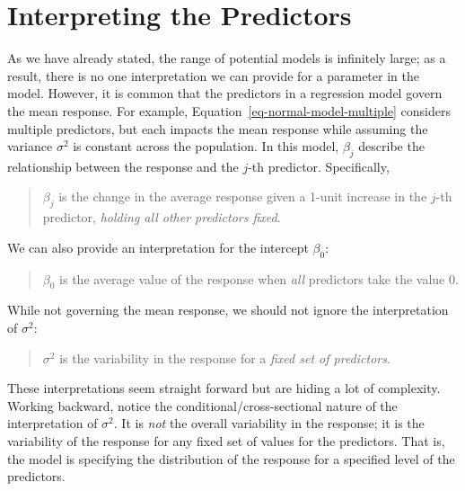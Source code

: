 \documentclass[
  letterpaper,
  DIV=11,
  numbers=noendperiod]{scrreprt}
\theoremstyle{definition}
\theoremstyle{definition}
\theoremstyle{plain}
\theoremstyle{remark}
\begin{document}
\hypertarget{interpreting-the-predictors}{%
\section{Interpreting the
Predictors}\label{interpreting-the-predictors}}

As we have already stated, the range of potential models is infinitely
large; as a result, there is no one interpretation we can provide for a
parameter in the model. However, it is common that the predictors in a
regression model govern the mean response. For example,
Equation~\ref{eq-normal-model-multiple} considers multiple predictors,
but each impacts the mean response while assuming the variance
\(\sigma^2\) is constant across the population. In this model,
\(\beta_j\) describe the relationship between the response and the
\(j\)-th predictor. Specifically,

\begin{quote}
\(\beta_j\) is the change in the average response given a 1-unit
increase in the \(j\)-th predictor, \emph{holding all other predictors
fixed}.
\end{quote}

We can also provide an interpretation for the intercept \(\beta_0\):

\begin{quote}
\(\beta_0\) is the average value of the response when \emph{all}
predictors take the value 0.
\end{quote}

While not governing the mean response, we should not ignore the
interpretation of \(\sigma^2\):

\begin{quote}
\(\sigma^2\) is the variability in the response for a \emph{fixed set of
predictors}.
\end{quote}

These interpretations seem straight forward but are hiding a lot of
complexity. Working backward, notice the conditional/cross-sectional
nature of the interpretation of \(\sigma^2\). It is \emph{not} the
overall variability in the response; it is the variability of the
response for any fixed set of values for the predictors. That is, the
model is specifying the distribution of the response for a specified
level of the predictors.
\end{document}
